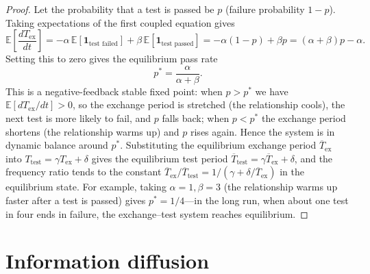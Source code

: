 \begin{proof}
Let the probability that a test is passed be $p$ (failure probability $1-p$). Taking expectations of the first coupled equation gives
\[
\mathbb{E}\left[\frac{dT_{\text{ex}}}{dt}\right] = -\alpha\,\mathbb{E}[\mathbf{1}_{\text{test failed}}] + \beta\,\mathbb{E}[\mathbf{1}_{\text{test passed}}] = -\alpha(1-p) + \beta p = (\alpha+\beta)p - \alpha.
\]
Setting this to zero gives the equilibrium pass rate
\[
p^* = \frac{\alpha}{\alpha+\beta}.
\]
This is a negative-feedback stable fixed point: when $p > p^*$ we have $\mathbb{E}[dT_{\text{ex}}/dt] > 0$, so the exchange period is stretched (the relationship cools), the next test is more likely to fail, and $p$ falls back; when $p < p^*$ the exchange period shortens (the relationship warms up) and $p$ rises again. Hence the system is in dynamic balance around $p^*$. Substituting the equilibrium exchange period $\overline{T}_{\text{ex}}$ into $T_{\text{test}} = \gamma T_{\text{ex}} + \delta$ gives the equilibrium test period $\overline{T}_{\text{test}} = \gamma\overline{T}_{\text{ex}} + \delta$, and the frequency ratio tends to the constant $\overline{T}_{\text{ex}}/\overline{T}_{\text{test}} = 1/(\gamma + \delta/\overline{T}_{\text{ex}})$ in the equilibrium state. For example, taking $\alpha=1, \beta=3$ (the relationship warms up faster after a test is passed) gives $p^* = 1/4$---in the long run, when about one test in four ends in failure, the exchange--test system reaches equilibrium.
\end{proof}

\section{Information diffusion}

